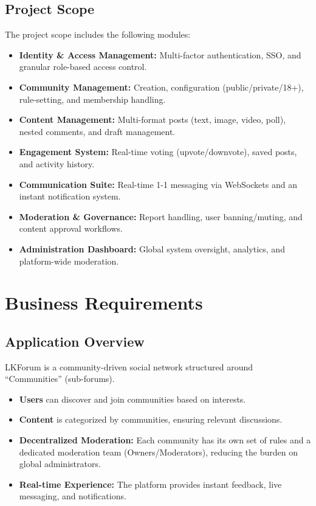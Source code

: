 \documentclass{scrreprt}
\begin{document}
\section{Project Scope}

The project scope includes the following modules:

\begin{itemize}
    \item \textbf{Identity \& Access Management:} Multi-factor authentication, SSO, and granular role-based access control.
    \item \textbf{Community Management:} Creation, configuration (public/private/18+), rule-setting, and membership handling.
    \item \textbf{Content Management:} Multi-format posts (text, image, video, poll), nested comments, and draft management.
    \item \textbf{Engagement System:} Real-time voting (upvote/downvote), saved posts, and activity history.
    \item \textbf{Communication Suite:} Real-time 1-1 messaging via WebSockets and an instant notification system.
    \item \textbf{Moderation \& Governance:} Report handling, user banning/muting, and content approval workflows.
    \item \textbf{Administration Dashboard:} Global system oversight, analytics, and platform-wide moderation.
\end{itemize}

\chapter{Business Requirements}

\section{Application Overview}

LKForum is a community-driven social network structured around ``Communities'' (sub-forums).

\begin{itemize}
    \item \textbf{Users} can discover and join communities based on interests.
    \item \textbf{Content} is categorized by communities, ensuring relevant discussions.
    \item \textbf{Decentralized Moderation:} Each community has its own set of rules and a dedicated moderation team (Owners/Moderators), reducing the burden on global administrators.
    \item \textbf{Real-time Experience:} The platform provides instant feedback, live messaging, and notifications.
\end{itemize}
\end{document}
